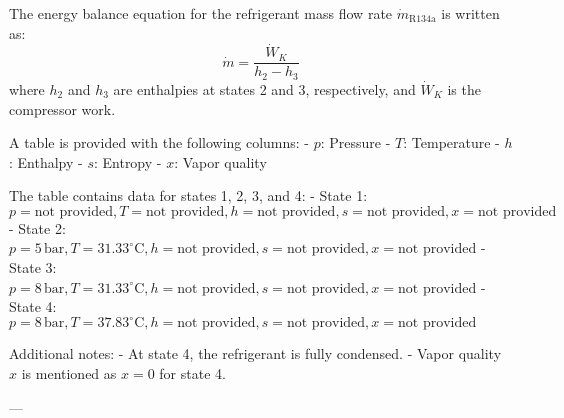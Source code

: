 The energy balance equation for the refrigerant mass flow rate \( \dot{m}_{\text{R134a}} \) is written as:  
\[
\dot{m} = \frac{\dot{W}_K}{h_2 - h_3}
\]  
where \( h_2 \) and \( h_3 \) are enthalpies at states 2 and 3, respectively, and \( \dot{W}_K \) is the compressor work.

A table is provided with the following columns:  
- \( p \): Pressure  
- \( T \): Temperature  
- \( h \): Enthalpy  
- \( s \): Entropy  
- \( x \): Vapor quality  

The table contains data for states 1, 2, 3, and 4:  
- State 1: \( p = \text{not provided}, T = \text{not provided}, h = \text{not provided}, s = \text{not provided}, x = \text{not provided} \)  
- State 2: \( p = 5 \, \text{bar}, T = 31.33^\circ\text{C}, h = \text{not provided}, s = \text{not provided}, x = \text{not provided} \)  
- State 3: \( p = 8 \, \text{bar}, T = 31.33^\circ\text{C}, h = \text{not provided}, s = \text{not provided}, x = \text{not provided} \)  
- State 4: \( p = 8 \, \text{bar}, T = 37.83^\circ\text{C}, h = \text{not provided}, s = \text{not provided}, x = \text{not provided} \)  

Additional notes:  
- At state 4, the refrigerant is fully condensed.  
- Vapor quality \( x \) is mentioned as \( x = 0 \) for state 4.

---